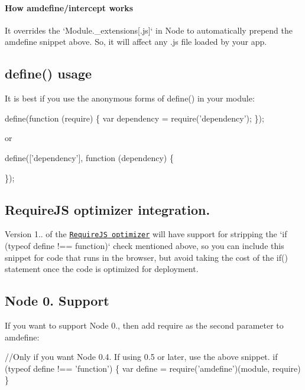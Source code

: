 \paragraph*{How amdefine/intercept works}

It overrides the `\+Module.\+\_\+extensions\mbox{[}\textquotesingle{}.js\textquotesingle{}\mbox{]}` in Node to automatically prepend the amdefine snippet above. So, it will affect any .js file loaded by your app.

\subsection*{define() usage}

It is best if you use the anonymous forms of define() in your module\+:


\begin{DoxyCode}
define(function (require) \{
    var dependency = require('dependency');
\});
\end{DoxyCode}


or


\begin{DoxyCode}
define(['dependency'], function (dependency) \{

\});
\end{DoxyCode}


\subsection*{Require\+JS optimizer integration. \label{_optimizer}%
}

Version 1.. of the \href{http://requirejs.org/docs/optimization.html}{\tt Require\+JS optimizer} will have support for stripping the `if (typeof define !== \textquotesingle{}function\textquotesingle{})` check mentioned above, so you can include this snippet for code that runs in the browser, but avoid taking the cost of the if() statement once the code is optimized for deployment.

\subsection*{Node 0. Support}

If you want to support Node 0., then add {\ttfamily require} as the second parameter to amdefine\+:


\begin{DoxyCode}
//Only if you want Node 0.4. If using 0.5 or later, use the above snippet.
if (typeof define !== 'function') \{ var define = require('amdefine')(module, require) \}
\end{DoxyCode}


